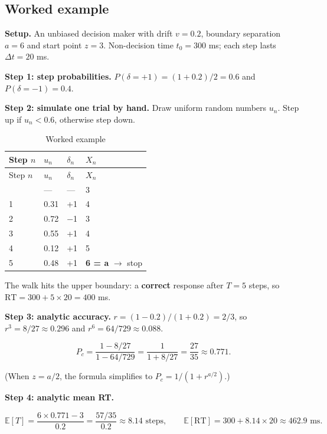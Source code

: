 \subsection{Worked example}

\textbf{Setup.} An unbiased decision maker with drift \(v = 0.2\),
boundary separation \(a = 6\) and start point \(z = 3\). Non-decision
time \(t_0 = 300\) ms; each step lasts \(\Delta t = 20\) ms.

\textbf{Step 1: step probabilities.}
\(P(\delta = +1) = (1 + 0.2)/2 = 0.6\) and \(P(\delta = -1) = 0.4\).

\textbf{Step 2: simulate one trial by hand.} Draw uniform random numbers
\(u_n\). Step up if \(u_n < 0.6\), otherwise step down.

\begin{longtable}[]{@{}llll@{}}
\caption{\centering Worked example}\tabularnewline
\toprule\noalign{}
Step \(n\) & \(u_n\) & \(\delta_n\) & \(X_n\) \\
\midrule\noalign{}
\endfirsthead
\toprule\noalign{}
Step \(n\) & \(u_n\) & \(\delta_n\) & \(X_n\) \\
\midrule\noalign{}
\endhead
\bottomrule\noalign{}
\endlastfoot
0 & --- & --- & 3 \\
1 & 0.31 & +1 & 4 \\
2 & 0.72 & −1 & 3 \\
3 & 0.55 & +1 & 4 \\
4 & 0.12 & +1 & 5 \\
5 & 0.48 & +1 & \textbf{6 = a} \ensuremath{\rightarrow} stop \\
\end{longtable}

The walk hits the upper boundary: a \textbf{correct} response after
\(T = 5\) steps, so \(\mathrm{RT} = 300 + 5 \times 20 = 400\) ms.

\textbf{Step 3: analytic accuracy.} \(r = (1-0.2)/(1+0.2) = 2/3\), so
\(r^3 = 8/27 \approx 0.296\) and \(r^6 = 64/729 \approx 0.088\).

\[
P_c = \frac{1 - 8/27}{1 - 64/729} = \frac{1}{1 + 8/27} = \frac{27}{35} \approx 0.771.
\]

(When \(z = a/2\), the formula simplifies to \(P_c = 1/(1 + r^{a/2})\).)

\textbf{Step 4: analytic mean RT.}

\[
\mathbb{E}[T] = \frac{6 \times 0.771 - 3}{0.2} = \frac{57/35}{0.2} \approx 8.14 \text{ steps},
\qquad
\mathbb{E}[\mathrm{RT}] = 300 + 8.14 \times 20 \approx 462.9 \text{ ms}.
\]

